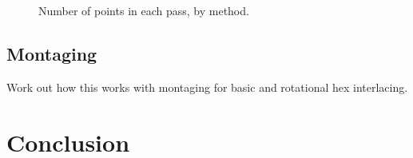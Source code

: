 \documentclass{article}
\begin{document}
\begin{figure}[ht]
\caption{\label{fig:passsizes} Number of points in each pass, by method.}
\end{figure}

\subsection{Montaging}
\label{sec:montaging}

Work out how this works with montaging for basic and rotational hex interlacing.

\section{Conclusion}
\label{sec:conclusion}



\end{document}
